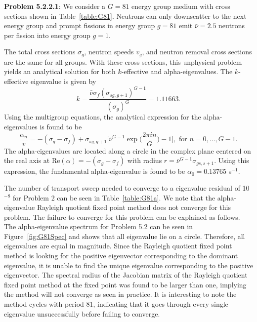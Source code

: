 
\textbf{Problem 5.2.2.1}: We consider a $G = 81$ energy group medium with cross sections shown in Table~\ref{table:G81}. Neutrons can only downscatter to the next energy group and prompt fissions in energy group $g = 81$ emit $\bar{\nu} = 2.5$ neutrons per fission into energy group $g = 1$.

The total cross sections $\sigma_{g}$, neutron speeds $v_{g}$, and neutron removal cross sections are the same for all groups. With these cross sections, this unphysical problem yields an analytical solution for both $k$-effective and alpha-eigenvalues. The $k$-effective eigenvalue is given by
\begin{equation}
	k = \frac{\bar{\nu} \sigma_{f} (\sigma_{sg,g+1})^{G-1}}{(\sigma_{g})^{G}} = 1.11663.
\end{equation}
Using the multigroup equations, the analytical expression for the alpha-eigenvalues is found to be
\begin{equation}
\frac{\alpha_{n}}{v} = -(\sigma_{g} - \sigma_{f}) + \sigma_{sg,g+1} \bigg [ \bar{\nu}^{G-1} \exp \bigg ( \frac{2 \pi i n}{G} \bigg ) - 1 \bigg ], \text{ for } n = 0, \dots, G-1. 
\end{equation}
The alpha-eigenvalues are located along a circle in the complex plane centered on the real axis at $\text{Re}(\alpha) = -(\sigma_{g} - \sigma_{f})$ with radius $r = \bar{\nu}^{G-1} \sigma_{gs,s+1}$. Using this expression, the fundamental alpha-eigenvalue is found to be $\alpha_{0} = 0.13765$ s$^{-1}$. 

The number of transport sweep needed to converge to a eigenvalue residual of 10$^{-8}$ for Problem 2 can be seen in Table~\ref{table:G81a}. We note that the alpha-eigenvalue Rayleigh quotient fixed point method does not converge for this problem. The failure to converge for this problem can be explained as follows. The alpha-eigenvalue spectrum for Problem 5.2 can be seen in Figure~\ref{fig:G81Spec} and shows that all eigenvalue lie on a circle. Therefore, all eigenvalues are equal in magnitude. Since the Rayleigh quotient fixed point method is looking for the positive eigenvector corresponding to the dominant eigenvalue, it is unable to find the unique eigenvalue corresponding to the positive eigenvector. The spectral radius of the Jacobian matrix of the Rayleigh quotient fixed point method at the fixed point was found to be larger than one, implying the method will not converge as seen in practice. It is interesting to note the method cycles with period 81, indicating that it goes through every single eigenvalue unsuccessfully before failing to converge.

